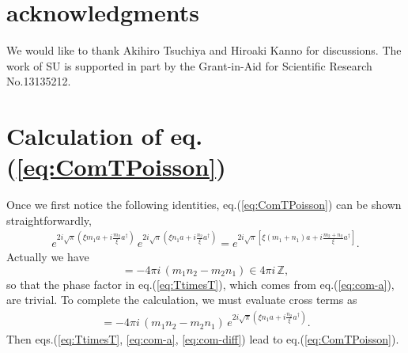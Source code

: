 \documentclass[a4paper,12pt]{article}
\begin{document}
\section*{acknowledgments}
We would like to thank Akihiro Tsuchiya and Hiroaki Kanno for
discussions. The work of SU is supported in part by the Grant-in-Aid
for Scientific Research No.13135212.

\appendix
\section{Calculation of eq.(\ref{eq:ComTPoisson})}
Once we first notice the following identities,
eq.(\ref{eq:ComTPoisson}) can be shown straightforwardly,
\begin{eqnarray}
e^{2i\sqrt{\pi}
	\left(\xi m_1a+i\frac{m_2}{\xi}a^\dagger\right)}\,
 e^{2i\sqrt{\pi}
	\left(\xi n_1a+i\frac{n_2}{\xi}a^\dagger\right)}
 =e^{2i\sqrt{\pi}
	\left[\xi
	(m_1+n_1)a+i\frac{m_2+n_2}{\xi}a^\dagger\right]}.
	\label{eq:TtimesT}
\end{eqnarray}
Actually we have
\begin{equation}
 [\,2i\sqrt{\pi}\,(\xi m_1a+i\frac{m_2}{\xi}a^\dagger),\,
  2i\sqrt{\pi}\,(\xi n_1a+i\frac{n_2}{\xi}a^\dagger)\,]
  =-4\pi i\,(m_1n_2-m_2n_1)\in 4\pi i\,{\mathbb Z}, \label{eq:com-a}
\end{equation}
so that the phase factor in eq.(\ref{eq:TtimesT}), which comes from
eq.(\ref{eq:com-a}), are trivial.
To complete the calculation, we must evaluate cross terms as
\begin{eqnarray}
[\,2i\sqrt{\pi}\,(\xi m_1a+i\frac{m_2}{\xi}a^\dagger) ,\,
    e^{2i\sqrt{\pi}\left(\xi
    n_1a+i\frac{n_2}{\xi}a^\dagger\right)}\,]=
  -4\pi i\,(m_1n_2-m_2n_1)\,
  e^{2i\sqrt{\pi}
	 \left(\xi n_1a+i\frac{n_2}{\xi}a^\dagger\right)}.
\label{eq:com-diff}
\end{eqnarray}
Then eqs.(\ref{eq:TtimesT}, \ref{eq:com-a}, \ref{eq:com-diff}) lead to
eq.(\ref{eq:ComTPoisson}).
\end{document}
